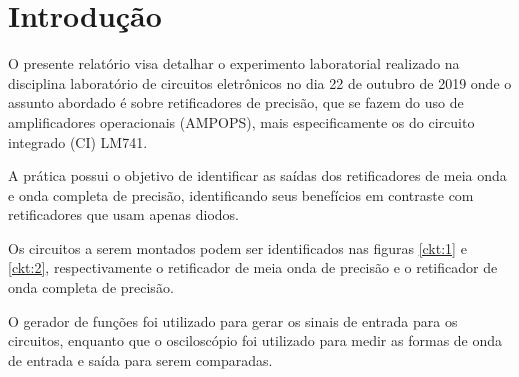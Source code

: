 \section{Introdução}


O presente relatório visa detalhar o experimento laboratorial realizado na disciplina laboratório de circuitos eletrônicos no dia 22 de outubro de 2019 onde o assunto abordado é sobre retificadores de precisão, que se fazem do uso de amplificadores operacionais (AMPOPS), mais especificamente os do circuito integrado (CI) LM741. 

A prática possui o objetivo de identificar as saídas dos retificadores de meia onda e onda completa de precisão, identificando seus benefícios em contraste com retificadores que usam apenas diodos.

Os circuitos a serem montados podem ser identificados nas figuras \ref{ckt:1} e \ref{ckt:2}, respectivamente o retificador de meia onda de precisão e o retificador de onda completa de precisão.




O gerador de funções foi utilizado para gerar os sinais de entrada para os circuitos, enquanto que o osciloscópio foi utilizado para medir as formas de onda de entrada e saída para serem comparadas.